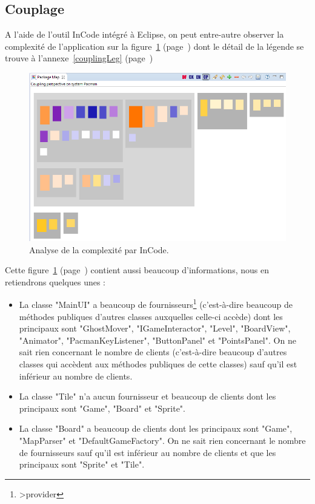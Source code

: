 \documentclass[12pt,a4paper,final]{article}
\newcommand{\annexe}[1]{annexe~\ref{#1} (page~\pageref{#1})}
\newcommand{\labelfigure}[1]{figure~\ref{#1} (page~\pageref{#1})}
\begin{document}
\subsection{Couplage}
A l'aide de l'outil InCode intégré à Eclipse, on peut entre-autre observer la complexité de l'application sur la \labelfigure{coupling} dont le détail de la légende se trouve à l'\annexe{couplingLeg}
\begin{figure}[!h]
	\centering
	\includegraphics[width=\textwidth]{InCodeCoupling.png}
	\caption{\label{coupling}Analyse de la complexité par InCode.}
\end{figure}
Cette \labelfigure{coupling} contient aussi beaucoup d'informations, nous en retiendrons quelques unes : 
\begin {itemize}
\item La classe "MainUI" a beaucoup de fournisseurs\footnote{>provider} (c'est-à-dire beaucoup de méthodes publiques d'autres classes auxquelles celle-ci accède) dont les principaux sont "GhostMover", "IGameInteractor", "Level", "BoardView", "Animator", "PacmanKeyListener", "ButtonPanel" et "PointsPanel". On ne sait rien concernant le nombre de clients (c'est-à-dire beaucoup d'autres classes qui accèdent aux méthodes publiques de cette classes) sauf qu'il est inférieur au nombre de clients.
\item La classe "Tile" n'a aucun fournisseur et beaucoup de clients dont les principaux sont "Game", "Board" et "Sprite".
\item La classe "Board" a beaucoup de clients dont les principaux sont "Game", "MapParser" et "DefaultGameFactory". On ne sait rien concernant le nombre de fournisseurs sauf qu'il est inférieur au nombre de clients et que les principaux sont "Sprite" et "Tile".
\end{itemize}
\end{document}
